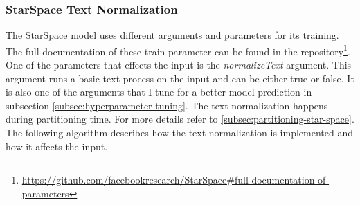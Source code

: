 \subsubsection{StarSpace Text Normalization}
\label{subsubsec:star-space-text-normalization}
The StarSpace model uses different arguments and parameters for its training. The full documentation of these train parameter can be found in the repository\footnote{\url{https://github.com/facebookresearch/StarSpace\#full-documentation-of-parameters}}. One of the parameters that effects the input is the \emph{normalizeText} argument. This argument runs a basic text process on the input and can be either true or false. It is also one of the arguments that I tune for a better model prediction in subsection \ref{subsec:hyperparameter-tuning}. The text normalization happens during partitioning time. For more details refer to \ref{subsec:partitioning-star-space}. The following algorithm describes how the text normalization is implemented and how it affects the input.

